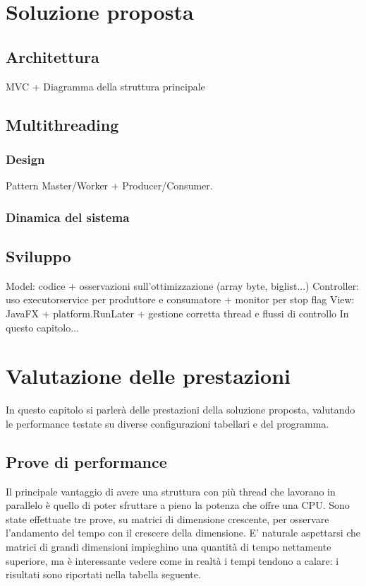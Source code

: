 \documentclass[12pt,a4paper,openright,oneside]{report}
\begin{document}
\chapter{Soluzione proposta}                %
\section{Architettura}						%
MVC + Diagramma della struttura principale
\section{Multithreading}		%
\subsection{Design}
Pattern Master/Worker + Producer/Consumer.
\subsection{Dinamica del sistema}
\section{Sviluppo}
Model: codice + osservazioni sull'ottimizzazione (array byte, biglist...)
Controller: uso executorservice per produttore e consumatore + monitor per stop flag
View: JavaFX + platform.RunLater + gestione corretta thread e flussi di controllo
\lhead[\fancyplain{}{\bfseries\thepage}]{\fancyplain{}{\bfseries\rightmark}}
In questo capitolo...
\clearpage{\pagestyle{empty}\cleardoublepage}
\chapter{Valutazione delle prestazioni}           %
\lhead[\fancyplain{}{\bfseries\thepage}]{\fancyplain{}{\bfseries\rightmark}}
In questo capitolo si parlerà delle prestazioni della soluzione proposta, valutando le performance testate su diverse
configurazioni tabellari e del programma.
\section{Prove di performance}					%
Il principale vantaggio di avere una struttura con più thread che lavorano in parallelo è quello di poter sfruttare a pieno la
potenza che offre una CPU. Sono state effettuate tre prove, su matrici di dimensione crescente, per osservare l'andamento del tempo
con il crescere della dimensione. E' naturale aspettarsi che matrici di grandi dimensioni impieghino una quantità di tempo nettamente superiore, ma è interessante vedere come in realtà i tempi tendono a calare: i risultati sono riportati nella tabella seguente.
\\
\end{document}
